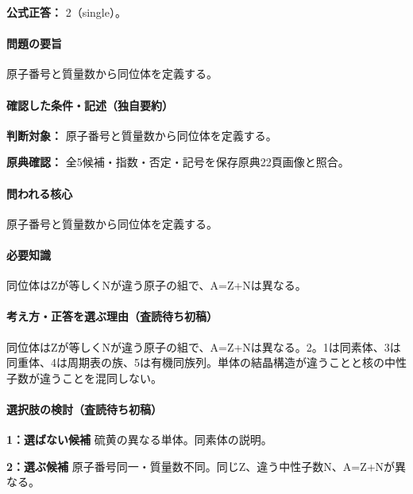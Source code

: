\textbf{公式正答：} 2（single）。

\paragraph{問題の要旨} 原子番号と質量数から同位体を定義する。

\paragraph{確認した条件・記述（独自要約）}\mbox{}\par

\noindent\textbf{判断対象：} 原子番号と質量数から同位体を定義する。\par

\noindent\textbf{原典確認：} 全5候補・指数・否定・記号を保存原典22頁画像と照合。\par

\paragraph{問われる核心} 原子番号と質量数から同位体を定義する。

\paragraph{必要知識} 同位体はZが等しくNが違う原子の組で、A=\allowbreak{}Z+Nは異なる。

\paragraph{考え方・正答を選ぶ理由（査読待ち初稿）} 同位体はZが等しくNが違う原子の組で、A=\allowbreak{}Z+Nは異なる。2。1は同素体、3は同重体、4は周期表の族、5は有機同族列。単体の結晶構造が違うことと核の中性子数が違うことを混同しない。

\paragraph{選択肢の検討（査読待ち初稿）}\mbox{}\par

\noindent\textbf{1：選ばない候補} 硫黄の異なる単体。同素体の説明。\par

\noindent\textbf{2：選ぶ候補} 原子番号同一・質量数不同。同じZ、違う中性子数N、A=\allowbreak{}Z+Nが異なる。\par

